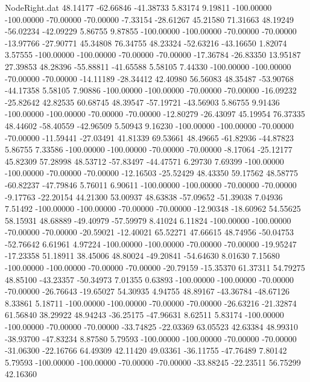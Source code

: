 \begin{filecontents}{NodeRight.dat}
  48.14177  -62.66846  -41.38733     5.83174    9.19811 -100.00000 -100.00000  -70.00000  -70.00000   -7.33154  -28.61267   45.21580   71.31663
  48.19249  -56.02234  -42.09229     5.86755    9.87855 -100.00000 -100.00000  -70.00000  -70.00000  -13.97766  -27.90771   45.34808   76.34755
  48.23324  -52.63216  -43.16650     1.82074    3.57555 -100.00000 -100.00000  -70.00000  -70.00000  -17.36784  -26.83350   13.95187   27.39853
  48.28396  -55.88811  -41.65588     5.58105    7.44330 -100.00000 -100.00000  -70.00000  -70.00000  -14.11189  -28.34412   42.40980   56.56083
  48.35487  -53.90768  -44.17358     5.58105    7.90886 -100.00000 -100.00000  -70.00000  -70.00000  -16.09232  -25.82642   42.82535   60.68745
  48.39547  -57.19721  -43.56903     5.86755    9.91436 -100.00000 -100.00000  -70.00000  -70.00000  -12.80279  -26.43097   45.19954   76.37335
  48.44602  -58.40559  -42.96509     5.50943    9.16230 -100.00000 -100.00000  -70.00000  -70.00000  -11.59441  -27.03491   41.81339   69.53661
  48.49665  -61.82936  -44.87823     5.86755    7.33586 -100.00000 -100.00000  -70.00000  -70.00000   -8.17064  -25.12177   45.82309   57.28998
  48.53712  -57.83497  -44.47571     6.29730    7.69399 -100.00000 -100.00000  -70.00000  -70.00000  -12.16503  -25.52429   48.43350   59.17562
  48.58775  -60.82237  -47.79846     5.76011    6.90611 -100.00000 -100.00000  -70.00000  -70.00000   -9.17763  -22.20154   44.21300   53.00937
  48.63838  -57.09652  -51.39038     7.04936    7.51492 -100.00000 -100.00000  -70.00000  -70.00000  -12.90348  -18.60962   54.55625   58.15931
  48.68889  -49.40979  -57.59979     8.41024    6.11824 -100.00000 -100.00000  -70.00000  -70.00000  -20.59021  -12.40021   65.52271   47.66615
  48.74956  -50.04753  -52.76642     6.61961    4.97224 -100.00000 -100.00000  -70.00000  -70.00000  -19.95247  -17.23358   51.18911   38.45006
  48.80024  -49.20841  -54.64630     8.01630    7.15680 -100.00000 -100.00000  -70.00000  -70.00000  -20.79159  -15.35370   61.37311   54.79275
  48.85100  -43.23357  -50.34973     7.01355    0.63893 -100.00000 -100.00000  -70.00000  -70.00000  -26.76643  -19.65027   54.30935    4.94755
  48.89167  -43.36784  -48.67126     8.33861    5.18711 -100.00000 -100.00000  -70.00000  -70.00000  -26.63216  -21.32874   61.56840   38.29922
  48.94243  -36.25175  -47.96631     8.62511    5.83174 -100.00000 -100.00000  -70.00000  -70.00000  -33.74825  -22.03369   63.05523   42.63384
  48.99310  -38.93700  -47.83234     8.87580    5.79593 -100.00000 -100.00000  -70.00000  -70.00000  -31.06300  -22.16766   64.49309   42.11420
  49.03361  -36.11755  -47.76489     7.80142    5.79593 -100.00000 -100.00000  -70.00000  -70.00000  -33.88245  -22.23511   56.75299   42.16360

\end{filecontents}
